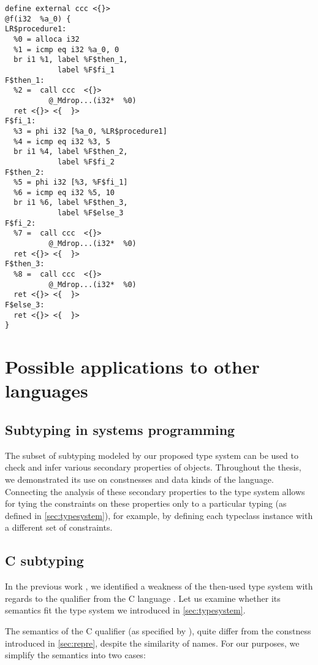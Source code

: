 \begin{codex}
\begin{center}
\begin{minipage}{0.6\linewidth}
\begin{lstlisting}[style=llvmStyle,basicstyle=\scriptsize\ttfamily]
define external ccc <{}>
@f(i32  %a_0) {
LR$procedure1:
  %0 = alloca i32
  %1 = icmp eq i32 %a_0, 0
  br i1 %1, label %F$then_1,
            label %F$fi_1
F$then_1:
  %2 =  call ccc  <{}>
          @_Mdrop...(i32*  %0)
  ret <{}> <{  }>
F$fi_1:
  %3 = phi i32 [%a_0, %LR$procedure1]
  %4 = icmp eq i32 %3, 5
  br i1 %4, label %F$then_2,
            label %F$fi_2
F$then_2:
  %5 = phi i32 [%3, %F$fi_1]
  %6 = icmp eq i32 %5, 10
  br i1 %6, label %F$then_3,
            label %F$else_3
F$fi_2:
  %7 =  call ccc  <{}>
          @_Mdrop...(i32*  %0)
  ret <{}> <{  }>
F$then_3:
  %8 =  call ccc  <{}>
          @_Mdrop...(i32*  %0)
  ret <{}> <{  }>
F$else_3:
  ret <{}> <{  }>
}
    \end{lstlisting}
    \end{minipage}
    \end{center}
\end{codex}

\section{Possible applications to other languages}

\subsection{Subtyping in systems programming}

The subset of subtyping modeled by our proposed type system can be used to check and infer various secondary properties of objects. Throughout the thesis, we demonstrated its use on constnesses and data kinds of the \cmm language. Connecting the analysis of these secondary properties to the type system allows for tying the constraints on these properties only to a particular typing (as defined in \cref{sec:typesystem}), for example, by defining each typeclass instance with a different set of constraints.

\subsection{C subtyping}

In the previous work \cite{klepl2020type}, we identified a weakness of the then-used type system with regards to the  qualifier from the C language \cite{cstandard2018}. Let us examine whether its semantics fit the type system we introduced in \cref{sec:typesystem}.

The semantics of the C  qualifier (as specified by \cite{cstandard2018}), quite differ from the constness introduced in \cref{sec:repre}, despite the similarity of names. For our purposes, we simplify the semantics into two cases:

